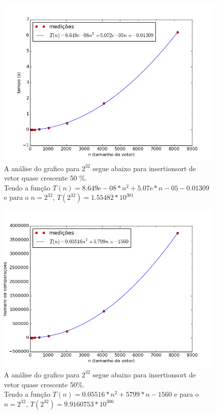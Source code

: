 \documentclass[12pt,a4paper,twoside]{report}
\begin{document}


\begin{figure}[ht]
\centering \includegraphics[scale=0.8]{../insertionsort/imagens/insertionsortQuaseCresc500.png}
\caption{A análise do grafico para $2^{32}$ segue abaixo para insertionsort de vetor quase crescente 50 \%.\\
Tendo a função $T(n) = 8.649\mathrm{e}-08*n^2+5.07\mathrm{e}*n-05-0.01309$ e para o $n =2^{32}$, $T(2^{32}) = 1.55482 * 10^{301}$}
\label{fig:insertionsortQuaseCresc500}
\end{figure}

\begin{figure}[ht]
\centering \includegraphics[scale=0.8]{../insertionsort/imagens/insertionsortQuaseCresc501.png}
\caption{A análise do grafico para $2^{32}$ segue abaixo para insertionsort de vetor quase crescente 50\%.\\
Tendo a função $T(n) = 0.05516*n^2+5799*n-1560$ e para o $n =2^{32}$, $T(2^{32}) = 9.9160753 * 10^{306}$}
\label{fig:insertionsortQuaseCresc501}
\end{figure}
\end{document}

